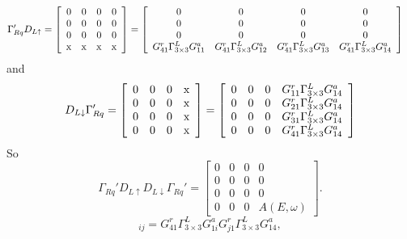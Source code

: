 \documentclass[11pt,a4paper]{article}
\begin{document}
\begin{equation}
\begin{split}
\Gamma_{Rq}'D_{L\uparrow} = 
\left[\begin{array}{cccc}
0 & 0 & 0 & 0 \\
0 & 0 & 0 & 0 \\
0 & 0 & 0 & 0 \\
\rm{x} & \rm{x} & \rm{x} & \rm{x}
\end{array}\right]
&= \left[\begin{array}{cccc}
0 & 0 & 0 & 0 \\
0 & 0 & 0 & 0 \\
0 & 0 & 0 & 0 \\
G_{41}^{r}\Gamma_{3\times3}^{L}G_{11}^{a} & G_{41}^{r}\Gamma_{3\times3}^{L}G_{12}^{a} & G_{41}^{r}\Gamma_{3\times3}^{L}G_{13}^{a} & G_{41}^{r}\Gamma_{3\times3}^{L}G_{14}^{a} \\
\end{array}\right]
\end{split}
\end{equation}
and
\begin{equation}
D_{L\downarrow}\Gamma_{Rq}' = 
\left[\begin{array}{cccc}
0 & 0 & 0 & \rm{x} \\
0 & 0 & 0 & \rm{x} \\
0 & 0 & 0 & \rm{x} \\
0 & 0 & 0 & \rm{x}
\end{array}\right] = 
\left[\begin{array}{cccc}
0 & 0 & 0 & G_{11}^{r}\Gamma_{3\times3}^{L}G_{14}^{a}\\
0 & 0 & 0 & G_{21}^{r}\Gamma_{3\times3}^{L}G_{14}^{a} \\
0 & 0 & 0 & G_{31}^{r}\Gamma_{3\times3}^{L}G_{14}^{a} \\
0 & 0 & 0 & G_{41}^{r}\Gamma_{3\times3}^{L}G_{14}^{a} \\
\end{array}\right]
\end{equation}
So 
\begin{equation}
\Gamma_{Rq}'D_{L\uparrow}D_{L\downarrow}\Gamma_{Rq}' = 
\left[\begin{array}{cccc}
0 & 0 & 0 & 0 \\
0 & 0 & 0 & 0 \\
0 & 0 & 0 & 0 \\
0 & 0 & 0 & A(E,\omega)
\end{array}\right].
\end{equation}
\begin{equation}
[A(E, \omega)]_{ij} = G_{41}^{r}\Gamma_{3\times3}^{L}G_{1i}^{a} G_{j1}^{r}\Gamma_{3\times3}^{L}G_{14}^{a},
\end{equation}
\end{document}
